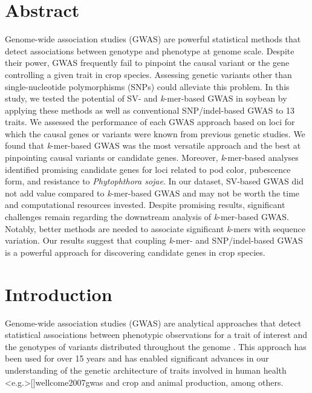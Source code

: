 \documentclass{article}
\begin{document}
\section*{Abstract}

Genome-wide association studies (GWAS) are powerful statistical methods that
detect associations between genotype and phenotype at genome scale. Despite
their power, GWAS frequently fail to pinpoint the causal variant or the gene
controlling a given trait in crop species. Assessing genetic variants other than
single-nucleotide polymorphisms (SNPs) could alleviate this problem.  In this
study, we tested the potential of SV- and \emph{k}-mer-based GWAS in soybean by
applying these methods as well as conventional SNP/indel-based GWAS to 13
traits. We assessed the performance of each GWAS approach based on loci for
which the causal genes or variants were known from previous genetic studies. We
found that \emph{k}-mer-based GWAS was the most versatile approach and the best
at pinpointing causal variants or candidate genes.  Moreover,
\textit{k}-mer-based analyses identified promising candidate genes for loci
related to pod color, pubescence form, and resistance to \textit{Phytophthora
sojae}. In our dataset, SV-based GWAS did not add value compared to
\textit{k}-mer-based GWAS and may not be worth the time and computational
resources invested.  Despite promising results, significant challenges remain
regarding the downstream analysis of \emph{k}-mer-based GWAS.  Notably, better
methods are needed to associate significant \emph{k}-mers with sequence
variation. Our results suggest that coupling \emph{k}-mer- and SNP/indel-based
GWAS is a powerful approach for discovering candidate genes in crop species.

\clearpage

\section*{Introduction}
Genome-wide association studies (GWAS) are analytical approaches that detect
statistical associations between phenotypic observations for a trait of
interest and the genotypes of variants distributed throughout the
genome . This approach has been used for over 15 years
 and has enabled significant advances in our understanding
of the genetic architecture of traits involved in human health
\shortcite<e.g.>[]{wellcome2007gwas} and crop  and animal
 production, among others.
\end{document}

